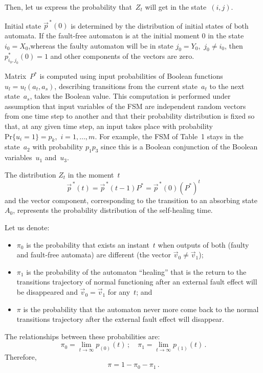 \begin{multicols}{2}
Then, let us express the probability that~$Z_t$ will get
in the state~$(i,j)$.

Initial state $\vec p^{\,*}(0)$ is determined by the distribution
of initial states of both automata.
If the fault-free automaton is at the initial moment 0 in the
state $i_0=X_0$,whereas the faulty automaton will be in state
$j_0=Y_0$,\  $j_0 \ne i_0$, then $p^*_{i_0,j_0}(0) = 1$
and other components of the vectors are zero.

Matrix~$P^*$ is computed using input probabilities of Boolean
functions $u_l=u_l(a_t,a_s)$, describing  transitions from
the current state~$a_t$ to the next state~$a_s$, takes the
Boolean value.
This computation  is performed under assumption that input
variables of the FSM are independent random vectors from one
time step to another and that their probability distribution
is fixed so that, at any given time step, an input takes
place with probability $\mathrm{Pr}\{u_i=1\}=p_k$,\  $i=1,\ldots,m$.
For example, the FSM of Table~1 stays in the state~$a_2$ with
probability $p_1 p_3$ since this is a Boolean
conjunction of the Boolean variables~$u_1$ and~$u_3$.

The distribution $Z_t$ in the moment~$t$
\begin{equation}
\vec p^{\,*}(t)
=
\vec p^{\,*}(t-1) P^* = \vec p^{\,*}(0)(P^*)^t             \label{e2fr}
\end{equation}
and the vector component, corresponding to the transition
to an absorbing state~$A_0$, represents the probability
distribution of the self-healing time.

Let us denote:
\begin{itemize}
\item $\pi_0$ is the probability that exists an instant~$t$ when
outputs of both (faulty and fault-free automata) are
different (the vector $\vec v_0 \ne \vec v_1$);
\item
$\pi_1$ is the probability of the automaton ``healing''
that is the return to the transitions trajectory of
normal functioning after an external fault effect will
be disappeared and $\vec v_0=\vec v_1$ for any~$t$; and
\item
$\pi$ is the probability that the automaton never more
come back to the normal transitions trajectory after
the external fault effect will disappear.
\end{itemize}

The relationships between these probabilities are:
$$
\pi_0 =
\lim_{t\to\infty} p_{(0)}(t)\,;
\quad
\pi_1 =
\lim_{t\to\infty} p_{(1)}(t)\,.
$$
Therefore,
\begin{equation}
\pi=1-\pi_0-\pi_1\,.
\label{e3fr}
\end{equation}


\end{multicols}
